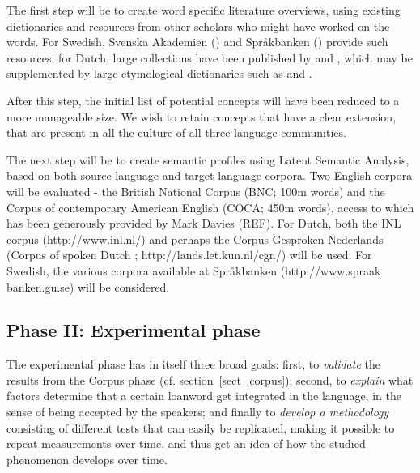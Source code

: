 \documentclass[a4paper]{article}
\begin{document}
The first step will be to create word specific literature overviews, using existing dictionaries and resources from other scholars who might have worked on the words. For Swedish, Svenska Akademien (\citet{Akademien2012}) and Spr\aa kbanken (\citet{Universitet2012}) provide such resources; for Dutch, large collections have been published by \cite{Koops2009} and \cite{Braamkolk2005}, which may be supplemented by large etymological dictionaries such as \citet{Sijs2001} and \citet{Sijs2005}.

After this step, the initial list of potential concepts will have been reduced to a more manageable size. We wish to retain concepts that have a clear extension, that are present in all the culture of all three language communities.

The next step will be to create semantic profiles using Latent Semantic Analysis, based on both source language and target language corpora. Two English corpora will be evaluated - the British National Corpus (BNC; 100m words) and the Corpus of contemporary American English (COCA; 450m words), access to which has been generously provided by Mark Davies (REF). For Dutch, both the INL corpus (http://www.inl.nl/) and perhaps the Corpus Gesproken Nederlands (Corpus of spoken Dutch ; http://lands.let.kun.nl/cgn/) will be used. For Swedish, the various corpora available at Spr\aa kbanken (http://www.spraak\\banken.gu.se) will be considered.


\subsection{Phase II: Experimental phase}

The experimental phase has in itself three broad goals:
first, to \emph{validate} the results from the Corpus phase (cf. section~\ref{sect_corpus});
second, to \emph{explain} what factors determine that a certain loanword get integrated in the language, in the sense of being accepted by the speakers;
and finally to \emph{develop a methodology} consisting of different tests that can easily be replicated, making it possible to repeat measurements over time, and thus get an idea of how the studied phenomenon develops over time.
\end{document}
